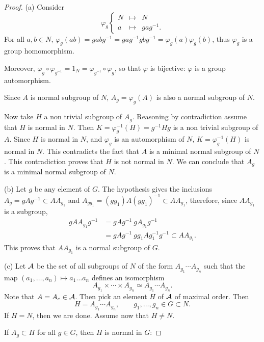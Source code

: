 \documentclass[11pt,a4paper]{article}
\begin{document}
\begin{proof}
\item[(a)] Consider
$$
\varphi_g
\left\{
\begin{array}{ccc}
N & \mapsto & N\\
a & \mapsto &gag^{-1}.
\end{array}
\right.
$$
For all $a,b \in N$, $\varphi_g(ab) = gabg^{-1} =gag^{-1} g bg^{-1} = \varphi_g(a) \varphi_g(b)$, thus $\varphi_g$ is a group homomorphism.

Moreover, $\varphi_g \circ \varphi_{g^{-1}} =  1_N = \varphi_{g^{-1}} \circ \varphi_g$, so that $\varphi$  is bijective: $\varphi$ is a group automorphism.

Since $A$ is normal subgroup of  $N$, $A_g = \varphi_g(A)$ is also a normal subgroup of $N$.

Now take $H$ a non trivial subgroup of $A_g$. Reasoning by contradiction assume that $H$ is normal in $N$. Then  $K = \varphi_g^{-1}(H) = g^{-1}H g$ is a non trivial subgroup of $A$. Since $H$ is normal in $N$, and $\varphi_g$ is an automorphism of $N$, $K = \varphi_g^{-1}(H)$ is normal in $N$. This contradicts the fact that $A$ is a minimal normal subgroup of $N$. This  contradiction proves that $H$ is not normal in $N$. We can conclude that $A_g$ is a minimal normal subgroup of $N$.

\item[(b)]  Let $g$ be any element of $G$. The hypothesis gives the inclusions $A_g = gAg^{-1} \subset AA_{g_1}$ and $A_{gg_1} = (gg_1) A (gg_1)^{-1} \subset AA_{g_1}$, therefore, since $AA_{g_1}$ is a subgroup,
\begin{align*}
gAA_{g_1} g^{-1} &= gA g^{-1}\ gA_{g_1} g^{-1}\\
&= gAg^{-1}\ gg_1A g_1^{-1}g^{-1} \subset AA_{g_1}.
\end{align*}
This proves that $A A_{g_1}$ is a normal subgroup of $G$.

\item[(c)] Let $\cal A$ be the set of all subgroups of $N$ of the form $A_{g_1}\cdots A_{g_n}$ such that the map $(a_1,\ldots,a_n) \mapsto a_1\ldots a_n$ defines an isomorphism
$$A_{g_1}\times\cdots\times A_{g_n} \simeq A_{g_1}\cdots A_{g_n}.$$
Note that $A = A_e \in {\cal A}$. Then pick an element $H$ of $\cal A$ of maximal order. Then 
$$H = A_{g_1}\cdots A_{g_n},\qquad g_1,\ldots,g_n \in G  \subset N.$$
If $H = N$, then we are done. Assume now that $H \ne N$.

If $A_g \subset H$ for all $g\in G$, then $H$ is normal in $G$: 


\end{proof}
\end{document}
